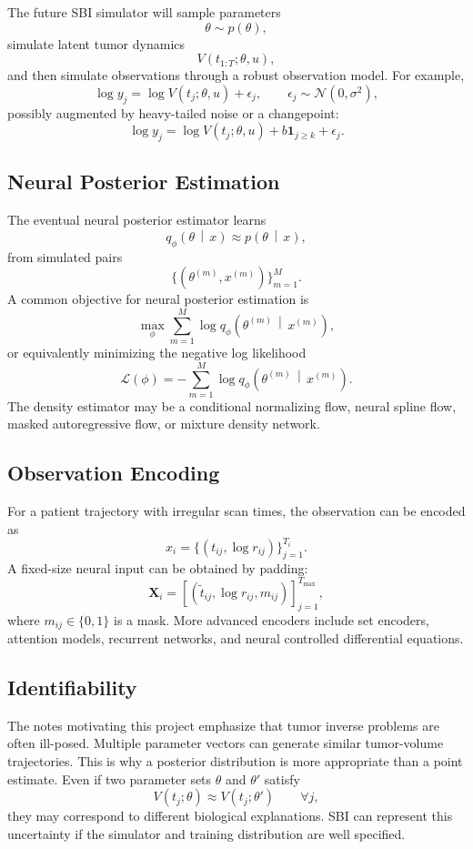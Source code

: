\documentclass[11pt,a4paper]{article}
\newcommand{\Normal}{\mathcal{N}}
\newcommand{\given}{\,\middle|\,}
\begin{document}
The future SBI simulator will sample parameters
\[
    \theta \sim p(\theta),
\]
simulate latent tumor dynamics
\[
    V(t_{1:T};\theta,u),
\]
and then simulate observations through a robust observation model. For example,
\[
    \log y_j
    = \log V(t_j;\theta,u) + \epsilon_j,
    \qquad
    \epsilon_j \sim \Normal(0,\sigma^2),
\]
possibly augmented by heavy-tailed noise or a changepoint:
\[
    \log y_j
    = \log V(t_j;\theta,u) + b\mathbf{1}_{j\geq k}+\epsilon_j.
\]

\subsection{Neural Posterior Estimation}

The eventual neural posterior estimator learns
\[
    q_\phi(\theta \given x)
    \approx p(\theta \given x),
\]
from simulated pairs
\[
    \{(\theta^{(m)},x^{(m)})\}_{m=1}^{M}.
\]
A common objective for neural posterior estimation is
\[
    \max_\phi \sum_{m=1}^{M}\log q_\phi(\theta^{(m)}\given x^{(m)}),
\]
or equivalently minimizing the negative log likelihood
\[
    \mathcal{L}(\phi)
    = -\sum_{m=1}^{M}\log q_\phi(\theta^{(m)}\given x^{(m)}).
\]
The density estimator may be a conditional normalizing flow, neural spline flow, masked autoregressive flow, or mixture density network.

\subsection{Observation Encoding}

For a patient trajectory with irregular scan times, the observation can be encoded as
\[
    x_i = \{(t_{ij},\log r_{ij})\}_{j=1}^{T_i}.
\]
A fixed-size neural input can be obtained by padding:
\[
    \mathbf{X}_i
    = \left[(\tilde{t}_{ij},\log r_{ij},m_{ij})\right]_{j=1}^{T_{\max}},
\]
where $m_{ij}\in\{0,1\}$ is a mask. More advanced encoders include set encoders, attention models, recurrent networks, and neural controlled differential equations.

\subsection{Identifiability}

The notes motivating this project emphasize that tumor inverse problems are often ill-posed. Multiple parameter vectors can generate similar tumor-volume trajectories. This is why a posterior distribution is more appropriate than a point estimate. Even if two parameter sets $\theta$ and $\theta'$ satisfy
\[
    V(t_j;\theta) \approx V(t_j;\theta')
    \qquad
    \forall j,
\]
they may correspond to different biological explanations. SBI can represent this uncertainty if the simulator and training distribution are well specified.
\end{document}
